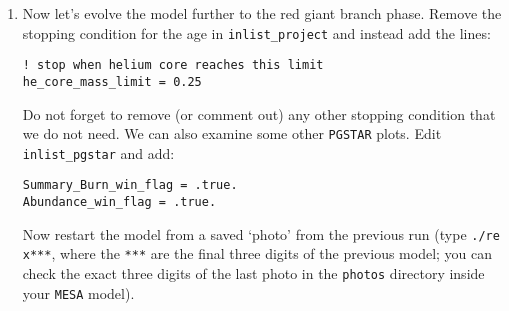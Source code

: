 \documentclass[11pt,a4paper]{article}
\begin{document}
\begin{enumerate}
\item Now let's evolve the model further to the red giant branch phase. Remove the stopping condition for the age in \verb|inlist_project| and instead add the lines:
\begin{verbatim}
! stop when helium core reaches this limit
he_core_mass_limit = 0.25
\end{verbatim}
Do not forget to remove (or comment out) any other stopping condition that we do not need. We can also examine some other \texttt{PGSTAR} plots. Edit \verb|inlist_pgstar| and add:
\begin{verbatim}
Summary_Burn_win_flag = .true.
Abundance_win_flag = .true.
\end{verbatim}
Now restart the model from a saved `photo' from the previous run (type \verb|./re x***|, where the \verb|***| are the final three digits of the previous model; you can check the exact three digits of the last photo in the \texttt{photos} directory inside your \texttt{MESA} model).


\end{enumerate}
\end{document}
